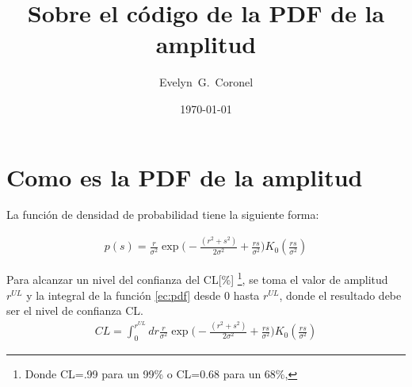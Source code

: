 
\usepackage{xparse}
\let\realItem\item %
\makeatletter
\NewDocumentCommand\myItem{ o }{%
   \IfNoValueTF{#1}%
      {\realItem}%
      {\realItem[#1]\def\@currentlabel{#1}}%
}
\makeatother

\usepackage{enumitem}    


\title{Sobre el código de la PDF de la amplitud}
\author{Evelyn~G.~Coronel}


\date[]{\lowercase{\today}} %


\maketitle


\section{Como  es la PDF de la amplitud}

La función de densidad de probabilidad tiene la siguiente forma:

\begin{align}
    p(s) =\frac{r}{\sigma^2}\exp{\Big( -\frac{(r^2+s^2)}{2\sigma^2} + \frac{rs}{\sigma^2}\Big)}K_0(\frac{rs}{\sigma^2})    \label{ec:pdf}
\end{align}    

Para alcanzar un  nivel del confianza  del  CL[\%] \footnote{ Donde CL=.99 para un 99\% o CL=0.68 para un 68\%,},  se toma el valor de amplitud $r^{UL}$ y la integral de la función \ref{ec:pdf} desde 0 hasta $r^{UL}$, donde el resultado debe ser el nivel de confianza CL.
\begin{align}
    CL = \int_{0}^{r^{UL}} dr \frac{r}{\sigma^2}\exp{\Big( -\frac{(r^2+s^2)}{2\sigma^2} + \frac{rs}{\sigma^2}\Big)}K_0(\frac{rs}{\sigma^2})
    \label{ec:integral}
\end{align}

